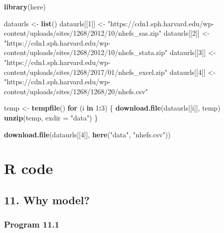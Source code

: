 \documentclass[10pt,]{book}
\newenvironment{Shaded}{\begin{snugshade}}{\end{snugshade}}
\newcommand{\ControlFlowTok}[1]{\textcolor[rgb]{0.13,0.29,0.53}{\textbf{#1}}}
\newcommand{\DataTypeTok}[1]{\textcolor[rgb]{0.13,0.29,0.53}{#1}}
\newcommand{\DecValTok}[1]{\textcolor[rgb]{0.00,0.00,0.81}{#1}}
\newcommand{\KeywordTok}[1]{\textcolor[rgb]{0.13,0.29,0.53}{\textbf{#1}}}
\newcommand{\NormalTok}[1]{#1}
\newcommand{\OperatorTok}[1]{\textcolor[rgb]{0.81,0.36,0.00}{\textbf{#1}}}
\newcommand{\StringTok}[1]{\textcolor[rgb]{0.31,0.60,0.02}{#1}}
\begin{document}
\begin{Shaded}
\begin{Highlighting}[]
\KeywordTok{library}\NormalTok{(here)}
\end{Highlighting}
\end{Shaded}

\begin{Shaded}
\begin{Highlighting}[]
\NormalTok{dataurls <-}\StringTok{ }\KeywordTok{list}\NormalTok{()}
\NormalTok{dataurls[[}\DecValTok{1}\NormalTok{]] <-}\StringTok{ "https://cdn1.sph.harvard.edu/wp-content/uploads/sites/1268/2012/10/nhefs_sas.zip"}
\NormalTok{dataurls[[}\DecValTok{2}\NormalTok{]] <-}\StringTok{ "https://cdn1.sph.harvard.edu/wp-content/uploads/sites/1268/2012/10/nhefs_stata.zip"}
\NormalTok{dataurls[[}\DecValTok{3}\NormalTok{]] <-}\StringTok{ "https://cdn1.sph.harvard.edu/wp-content/uploads/sites/1268/2017/01/nhefs_excel.zip"}
\NormalTok{dataurls[[}\DecValTok{4}\NormalTok{]] <-}\StringTok{ "https://cdn1.sph.harvard.edu/wp-content/uploads/sites/1268/1268/20/nhefs.csv"}

\NormalTok{temp <-}\StringTok{ }\KeywordTok{tempfile}\NormalTok{()}
\ControlFlowTok{for}\NormalTok{ (i }\ControlFlowTok{in} \DecValTok{1}\OperatorTok{:}\DecValTok{3}\NormalTok{) \{}
    \KeywordTok{download.file}\NormalTok{(dataurls[[i]], temp)}
    \KeywordTok{unzip}\NormalTok{(temp, }\DataTypeTok{exdir =} \StringTok{"data"}\NormalTok{)}
\NormalTok{\}}

\KeywordTok{download.file}\NormalTok{(dataurls[[}\DecValTok{4}\NormalTok{]], }\KeywordTok{here}\NormalTok{(}\StringTok{"data"}\NormalTok{, }\StringTok{"nhefs.csv"}\NormalTok{))}
\end{Highlighting}
\end{Shaded}

\mainmatter

\hypertarget{part-r-code}{%
\part*{R code}\label{part-r-code}}

\hypertarget{why-model}{%
\chapter*{11. Why model?}\label{why-model}}

\hypertarget{program-11.1}{%
\section{Program 11.1}\label{program-11.1}}
\end{document}
